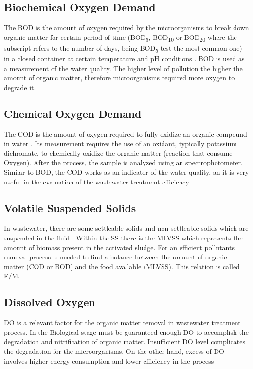 \subsection{Biochemical Oxygen Demand}
The \ac{BOD} is the amount of oxygen required by the microorganisms to break down organic matter for certain period of time (BOD\textsubscript{5}, BOD\textsubscript{10} or BOD\textsubscript{20} where the subscript refers to the number of days, being BOD\textsubscript{5} test the most common one) in a closed container at certain temperature and pH conditions \cite{Wiesmann2007}. \ac{BOD} is used as a measurement of the water quality. The higher level of pollution the higher the amount of organic matter, therefore microorganisms required more oxygen to degrade it.

\subsection{Chemical Oxygen Demand}
The \ac{COD} is the amount of oxygen required to fully oxidize an organic compound in water \cite{Wiesmann2007}. Its measurement requires the use of an oxidant, typically potassium dichromate, to chemically oxidize the organic matter (reaction that consume Oxygen). After the process, the sample is analyzed using an spectrophotometer. Similar to \ac{BOD}, the \ac{COD} works as an indicator of the water quality, an it is very useful in the evaluation of the wastewater treatment efficiency.

\subsection{Volatile Suspended Solids}
In wastewater, there are some settleable solids and non-settleable solids which are suspended in the fluid \cite{Wiesmann2007}. Within the \ac{SS} there is the \ac{MLVSS} which represents the amount of biomass present in the activated sludge. For an efficient pollutants removal process is needed to find a balance between the amount of organic matter (\ac{COD} or \ac{BOD}) and the food available (\ac{MLVSS}). This relation is called F/M.

\subsection{Dissolved Oxygen}
\ac{DO} is a relevant factor for the organic matter removal in wastewater treatment process. In the Biological stage must be guaranteed enough \ac{DO} to accomplish the degradation and nitrification of organic matter. Insufficient \ac{DO} level complicates the degradation for the microorganisms. On the other hand, excess of \ac{DO} involves higher energy consumption and lower efficiency in the process \cite{Zhao2021}. 


